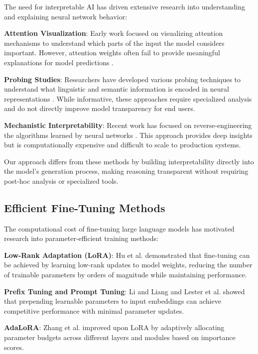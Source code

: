 The need for interpretable AI has driven extensive research into understanding and explaining neural network behavior:

\textbf{Attention Visualization}: Early work focused on visualizing attention mechanisms \cite{vaswani2017attention} to understand which parts of the input the model considers important. However, attention weights often fail to provide meaningful explanations for model predictions \cite{jain2019attention}.

\textbf{Probing Studies}: Researchers have developed various probing techniques to understand what linguistic and semantic information is encoded in neural representations \cite{rogers2020primer}. While informative, these approaches require specialized analysis and do not directly improve model transparency for end users.

\textbf{Mechanistic Interpretability}: Recent work has focused on reverse-engineering the algorithms learned by neural networks \cite{elhage2021mathematical}. This approach provides deep insights but is computationally expensive and difficult to scale to production systems.

Our approach differs from these methods by building interpretability directly into the model's generation process, making reasoning transparent without requiring post-hoc analysis or specialized tools.

\subsection{Efficient Fine-Tuning Methods}

The computational cost of fine-tuning large language models has motivated research into parameter-efficient training methods:

\textbf{Low-Rank Adaptation (LoRA)}: Hu et al. \cite{hu2021lora} demonstrated that fine-tuning can be achieved by learning low-rank updates to model weights, reducing the number of trainable parameters by orders of magnitude while maintaining performance.

\textbf{Prefix Tuning and Prompt Tuning}: Li and Liang \cite{li2021prefix} and Lester et al. \cite{lester2021power} showed that prepending learnable parameters to input embeddings can achieve competitive performance with minimal parameter updates.

\textbf{AdaLoRA}: Zhang et al. \cite{zhang2023adalora} improved upon LoRA by adaptively allocating parameter budgets across different layers and modules based on importance scores.


